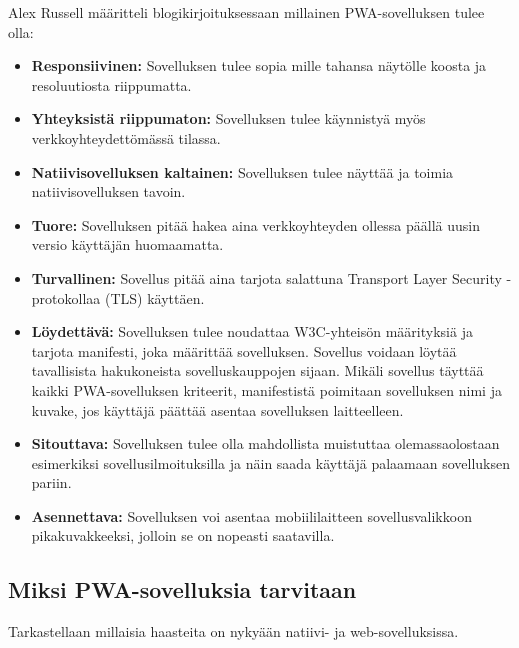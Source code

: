 \documentclass{tktltiki}
\begin{document}
Alex Russell määritteli blogikirjoituksessaan \cite{Russell} millainen PWA-sovelluksen tulee olla: 

\begin{itemize}
  \item \textbf{Responsiivinen:} Sovelluksen tulee sopia mille tahansa näytölle koosta ja resoluutiosta riippumatta.
  \item \textbf{Yhteyksistä riippumaton:} Sovelluksen tulee käynnistyä myös verkkoyhteydettömässä tilassa.
  \item \textbf{Natiivisovelluksen kaltainen:} Sovelluksen tulee näyttää ja toimia natiivisovelluksen tavoin.
  \item \textbf{Tuore:} Sovelluksen pitää hakea aina verkkoyhteyden ollessa päällä uusin versio käyttäjän huomaamatta.
  \item \textbf{Turvallinen:} Sovellus pitää aina tarjota salattuna Transport Layer Security -protokollaa (TLS) käyttäen.
  \item \textbf{Löydettävä:} Sovelluksen tulee noudattaa W3C-yhteisön määrityksiä ja tarjota manifesti, joka määrittää sovelluksen. Sovellus voidaan löytää tavallisista hakukoneista sovelluskauppojen sijaan. Mikäli sovellus täyttää kaikki PWA-sovelluksen kriteerit, manifestistä poimitaan sovelluksen nimi ja kuvake, jos käyttäjä päättää asentaa sovelluksen laitteelleen.
  \item \textbf{Sitouttava:} Sovelluksen tulee olla mahdollista muistuttaa olemassaolostaan esimerkiksi sovellusilmoituksilla ja näin saada käyttäjä palaamaan sovelluksen pariin.
  \item \textbf{Asennettava:} Sovelluksen voi asentaa mobiililaitteen sovellusvalikkoon pikakuvakkeeksi, jolloin se on nopeasti saatavilla.
\end{itemize}

\subsection{Miksi PWA-sovelluksia tarvitaan}
\enlargethispage{5mm}

Tarkastellaan millaisia haasteita on nykyään natiivi- ja web-sovelluksissa.
\end{document}
